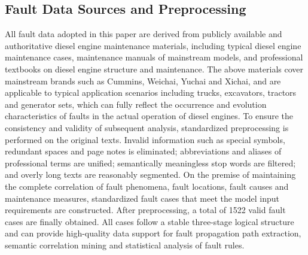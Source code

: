 \documentclass[conference]{IEEEconf}
\begin{document}
\subsection{Fault Data Sources and Preprocessing}
All fault data adopted in this paper are derived from publicly available and authoritative diesel engine maintenance materials, including typical diesel engine maintenance cases, maintenance manuals of mainstream models, and professional textbooks on diesel engine structure and maintenance. The above materials cover mainstream brands such as Cummins, Weichai, Yuchai and Xichai, and are applicable to typical application scenarios including trucks, excavators, tractors and generator sets, which can fully reflect the occurrence and evolution characteristics of faults in the actual operation of diesel engines. To ensure the consistency and validity of subsequent analysis, standardized preprocessing is performed on the original texts. Invalid information such as special symbols, redundant spaces and page notes is eliminated; abbreviations and aliases of professional terms are unified; semantically meaningless stop words are filtered; and overly long texts are reasonably segmented. On the premise of maintaining the complete correlation of fault phenomena, fault locations, fault causes and maintenance measures, standardized fault cases that meet the model input requirements are constructed. After preprocessing, a total of 1522 valid fault cases are finally obtained. All cases follow a stable three-stage logical structure and can provide high-quality data support for fault propagation path extraction, semantic correlation mining and statistical analysis of fault rules.
\end{document}
